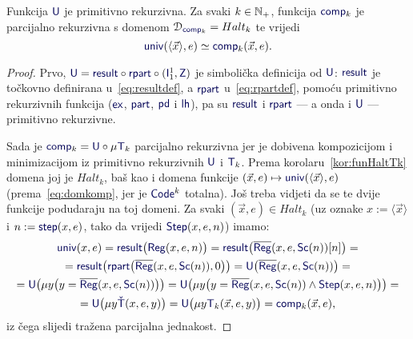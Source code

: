 \begin{propozicija}[{name=[parcijalna rekurzivnost univerzalnih funkcija dane mjesnosti]}]\label{prop:compspec}
Funkcija $\f U$ je primitivno rekurzivna. Za svaki $k\in{\mathbb N}_+$, funkcija $\f{comp}_k$ je parcijalno rekurzivna s domenom $\dom{\f{comp}_k}=Halt_k$ te vrijedi \begin{equation}\label{eq:comp=univ}
    \f{univ}(\langle\vec x\rangle,e)\simeq\f{comp}_k(\vec x,e)\text.
\end{equation}
\end{propozicija}
\begin{proof}
Prvo, $\f U=\f{result}\circ\f{rpart}\circ(\f I_1^1,\f Z)$ je simbolička definicija od $\f U$: $\f{result}$ je točkovno definirana u~\eqref{eq:resultdef}, a $\f{rpart}$ u~\eqref{eq:rpartdef}, pomoću primitivno rekurzivnih funkcija ($\f{ex}$, $\f{part}$, $\f{pd}$ i $\f{lh}$), pa su $\f{result}$ i $\f{rpart}$ --- a onda i $\f U$ --- primitivno rekurzivne.

	Sada je $\f{comp}_k=\f U\circ\mu\f T_k$ parcijalno rekurzivna jer je dobivena kompozicijom i minimizacijom iz primitivno rekurzivnih $\f U$ i $\f T_k$. Prema korolaru~\ref{kor:funHaltTk} domena joj je $Halt_k$, baš kao i domena funkcije $(\vec x,e)\mapsto\f{univ}(\langle\vec x\rangle,e)$ (prema~\eqref{eq:domkomp}, jer je $\f{Code}^k$ totalna). Još treba vidjeti da se te dvije funkcije podudaraju na toj domeni. Za svaki $(\vec x,e)\in Halt_k$ (uz oznake $x:=\langle\vec x\rangle$ i $n:=\f{step}(x,e)$, tako da vrijedi $\f{Step}(x,e,n)$) imamo:
\begin{multline}
    \f{univ}(x,e)=
    \f{result}\bigl(\f{Reg}(x,e,n)\bigr)=
    \f{result}\bigl(\overline{\f{Reg}}(x,e,\f{Sc}(n))[n]\bigr)=\\
    =
    \f{result}\bigl(\f{rpart}\bigl(\overline{\f{Reg}}(x,e,\f{Sc}(n)),0\bigr)\bigr)=
    \f U\bigl(\overline{\f{Reg}}(x,e,\f{Sc}(n))\bigr)
    =\\
    =\f U\bigl(\mu y\bigl(y=\overline{\f{Reg}}(x,e,\f{Sc}(n))\bigr)\bigr)=
    \f U\bigl(\mu y\bigl(y=\overline{\f{Reg}}(x,e,\f{Sc}(n))\land\f{Step}(x,e,n)\bigr)\bigr)=\\
    =\f U\bigl(\mu y\f{\check T}(x,e,y)\bigr)=
    \f U\bigl(\mu y\f T_k(\vec x,e,y)\bigr)=
    \f{comp}_k(\vec x,e)\text,
\end{multline}
iz čega slijedi tražena parcijalna jednakost.
\end{proof}

